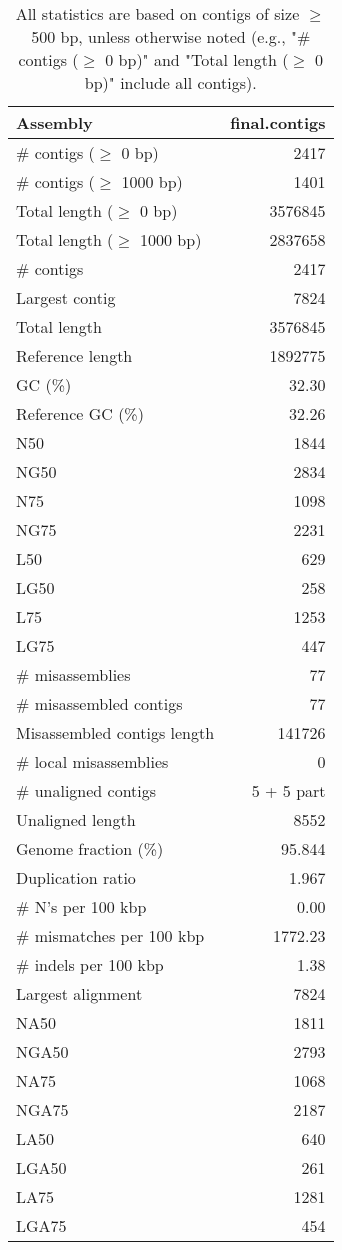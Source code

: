 \documentclass[12pt,a4paper]{article}
\begin{document}
\begin{table}[ht]
\begin{center}
\caption{All statistics are based on contigs of size $\geq$ 500 bp, unless otherwise noted (e.g., "\# contigs ($\geq$ 0 bp)" and "Total length ($\geq$ 0 bp)" include all contigs).}
\begin{tabular}{|l*{1}{|r}|}
\hline
Assembly & final.contigs \\ \hline
\# contigs ($\geq$ 0 bp) & 2417 \\ \hline
\# contigs ($\geq$ 1000 bp) & 1401 \\ \hline
Total length ($\geq$ 0 bp) & 3576845 \\ \hline
Total length ($\geq$ 1000 bp) & 2837658 \\ \hline
\# contigs & 2417 \\ \hline
Largest contig & 7824 \\ \hline
Total length & 3576845 \\ \hline
Reference length & 1892775 \\ \hline
GC (\%) & 32.30 \\ \hline
Reference GC (\%) & 32.26 \\ \hline
N50 & 1844 \\ \hline
NG50 & 2834 \\ \hline
N75 & 1098 \\ \hline
NG75 & 2231 \\ \hline
L50 & 629 \\ \hline
LG50 & 258 \\ \hline
L75 & 1253 \\ \hline
LG75 & 447 \\ \hline
\# misassemblies & 77 \\ \hline
\# misassembled contigs & 77 \\ \hline
Misassembled contigs length & 141726 \\ \hline
\# local misassemblies & 0 \\ \hline
\# unaligned contigs & 5 + 5 part \\ \hline
Unaligned length & 8552 \\ \hline
Genome fraction (\%) & 95.844 \\ \hline
Duplication ratio & 1.967 \\ \hline
\# N's per 100 kbp & 0.00 \\ \hline
\# mismatches per 100 kbp & 1772.23 \\ \hline
\# indels per 100 kbp & 1.38 \\ \hline
Largest alignment & 7824 \\ \hline
NA50 & 1811 \\ \hline
NGA50 & 2793 \\ \hline
NA75 & 1068 \\ \hline
NGA75 & 2187 \\ \hline
LA50 & 640 \\ \hline
LGA50 & 261 \\ \hline
LA75 & 1281 \\ \hline
LGA75 & 454 \\ \hline
\end{tabular}
\end{center}
\end{table}
\end{document}

